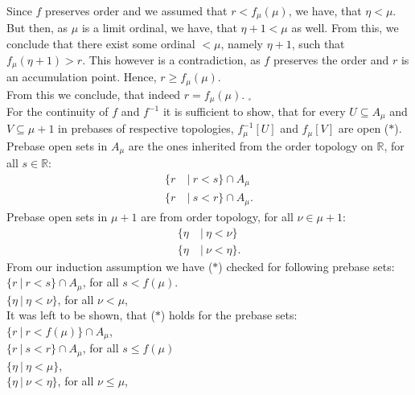 Since $f$ preserves order and we assumed that $r < f_\mu(\mu)$, we have, that $\eta < \mu$. 
But then, as $\mu$ is a limit ordinal, we have, that $\eta +1 < \mu$ as well. From this, 
we conclude that there exist some ordinal $<\mu$, namely $\eta +1$, such that $f_\mu(\eta+1) > r$. 
This however is a contradiction, as $f$ preserves the order and $r$ is an accumulation point. 
Hence, $r \geq f_\mu(\mu)$. \\
From this we conclude, that indeed $r = f_\mu(\mu)$. $_\square$\\
For the continuity of $f$ and $f^{-1}$ it is sufficient to show, that for every 
$U \subseteq A_\mu$ and $V \subseteq \mu+1$ 
in prebases of respective topologies, $f_\mu^{-1}[U]$ and $f_\mu[V]$ are open ($\ast$). \\
Prebase open sets in $A_\mu$ are the ones inherited from the order topology on $\mathbb{R}$, 
for all $s \in \mathbb{R}$:
\begin{align*}
\{r\ &|\ r<s\} \cap A_\mu\\
\{r\ &|\ s<r\} \cap A_\mu.
\end{align*}
Prebase open sets in $\mu+1$ are from order topology, for all $\nu \in \mu+1$:
\begin{align*}
\{\eta\ &|\ \eta<\nu\} \\
\{\eta\ &|\ \nu<\eta\}.
\end{align*}
From our induction assumption we have ($\ast$) checked for following prebase sets: \\
$\{r\ |\ r<s\} \cap A_\mu$, for all $s < f(\mu)$. \\
$\{\eta\ |\ \eta<\nu\}$, for all $\nu < \mu$, \\
It was left to be shown, that ($\ast$) holds for the prebase sets: \\
$\{r\ |\ r<f(\mu)\} \cap A_\mu$, \\
$\{r\ |\ s<r\} \cap A_\mu$, for all $s \leq f(\mu)$\\
$\{\eta\ |\ \eta<\mu\}$, \\
$\{\eta\ |\ \nu<\eta\}$, for all $\nu \leq \mu$, \\ 

